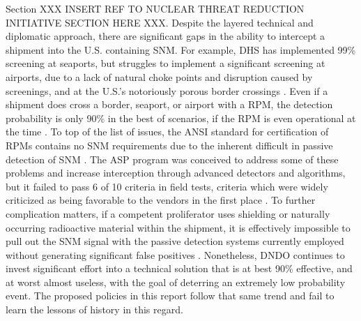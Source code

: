 \documentclass{report}
\begin{document}
Section XXX INSERT REF TO NUCLEAR THREAT REDUCTION INITIATIVE SECTION HERE XXX.  Despite the layered technical and diplomatic approach, there are significant gaps in the ability to intercept a shipment into the U.S. containing SNM.  For example, DHS has implemented 99\% screening at seaports, but struggles to implement a significant screening at airports, due to a lack of natural choke points and disruption caused by screenings, and at the U.S.'s notoriously porous border crossings \cite{DepartmentofHomelandSecurityDHS2013,GovernmentAccountabilityOffice2012}.  Even if a shipment does cross a border, seaport, or airport with a RPM, the detection probability is only 90\% in the best of scenarios, if the RPM is even operational at the time \cite{DepartmentofHomelandSecurityDHS2013,DepartmentofHomelandSecurityDHS2006}.  To top of the list of issues, the ANSI standard for certification of RPMs contains no SNM requirements due to the inherent difficult in passive detection of SNM \cite{Ansi2007}.  The ASP program was conceived to address some of these problems and increase interception through advanced detectors and algorithms, but it failed to pass 6 of 10 criteria in field tests, criteria which were widely criticized as being favorable to the vendors in the first place \cite{UnitedStatesGovernmentAccountabilityOffice2013}. To further complication matters, if a competent proliferator uses shielding or naturally occurring radioactive material within the shipment, it is effectively impossible to pull out the SNM signal with the passive detection systems currently employed without generating significant false positives \cite{UnitedStatesGovernmentAccountabilityOffice2013,UnitedStatesCongress.House.CommitteeonHomelandSecurity.SubcommitteeonEmergingThreatsCybersecurity2007}.  Nonetheless, DNDO continues to invest significant effort into a technical solution that is at best 90\% effective, and at worst almost useless, with the goal of deterring an extremely low probability event.  The proposed policies in this report follow that same trend and fail to learn the lessons of history in this regard.      
\end{document}
